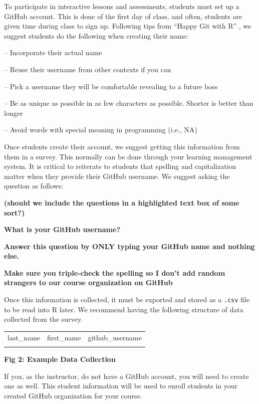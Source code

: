 \documentclass[
  12pt]{article}
\begin{document}
To participate in interactive lessons and assessments, students must set
up a GitHub account. This is done of the first day of class, and often,
students are given time during class to sign up. Following tips from
``Happy Git with R'' \citep{bryan_hester_2020}, we suggest students do
the following when creating their name:

-- Incorporate their actual name

-- Reuse their username from other contexts if you can

-- Pick a username they will be comfortable revealing to a future boss

-- Be as unique as possible in as few characters as possible. Shorter is
better than longer

-- Avoid words with special meaning in programming (i.e., NA)

Once students create their account, we suggest getting this information
from them in a survey. This normally can be done through your learning
management system. It is critical to reiterate to students that spelling
and capitalization matter when they provide their GitHub username. We
suggest asking the question as follows:

\textbf{(should we include the questions in a highlighted text box of
some sort?)}

\textbf{What is your GitHub username?}

\textbf{Answer this question by ONLY typing your GitHub name and nothing
else.}

\textbf{Make sure you triple-check the spelling so I don't add random
strangers to our course organization on GitHub}

Once this information is collected, it must be exported and stored as a
\texttt{.csv} file to be read into R later. We recommend having the
following structure of data collected from the survey.

\begin{longtable}[]{@{}lll@{}}
\toprule()
\endhead
last\_name & first\_name & github\_username \\
& & \\
\bottomrule()
\end{longtable}

\textbf{Fig 2: Example Data Collection}

If you, as the instructor, do not have a GitHub account, you will need
to create one as well. This student information will be used to enroll
students in your created GitHub organization for your course.
\end{document}
